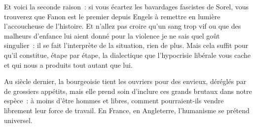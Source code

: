 \documentclass[french,twoside]{book} %
\begin{document}
\noindent Et voici la seconde raison : si vous écartez les bavardages fascistes de Sorel, vous trouverez que Fanon est le premier depuis Engels à remettre en lumière l’accoucheuse de l’histoire. Et n’allez pas croire qu’un sang trop vif ou que des malheurs d’enfance lui aient donné pour la violence je ne sais quel goût singulier : il se fait l’interprète de la situation, rien de plus. Mais cela suffit pour qu’il constitue, étape par étape, la dialectique que l’hypocrisie libérale vous cache et qui nous a produits tout autant que lui.\par
Au siècle dernier, la bourgeoisie tient les ouvriers pour des envieux, déréglés par de grossiers appétits, mais elle prend soin d’inclure ces grands brutaux dans notre espèce : à moins d’être hommes et libres, comment pourraient-ils vendre librement leur force de travail. En France, en Angleterre, l’humanisme se prétend universel.\par
\end{document}
